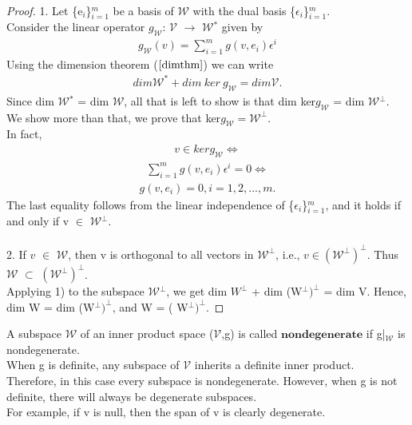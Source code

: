 \documentclass[12pt,a4paper]{article}
\begin{document}
\begin{proof}
1. Let \{e$_i$\}$^m_{i=1}$  be a basis of $\mathcal{W}$ with the dual basis \{$\epsilon$$_i$\}$^m_{i=1}$. \\Consider the linear operator $g_\mathcal{W}$: $\mathcal{V}$ $\to$ $\mathcal{W}$$^*$ given by
\begin{align*}
g_\mathcal{W}(v) = \sum_{i=1}^{m} g(v, e_i)\epsilon^i
\end{align*}
 Using the dimension theorem ($\ref{dimthm}$) we can write
 \begin{align*}
dim \mathcal{W}^* + dim \ ker \ g_\mathcal{W} = dim \mathcal{V}.
\end{align*}
Since dim $\mathcal{W}$$^*$ = dim $\mathcal{W}$, all that is left to show is that dim ker$g_\mathcal{W}$ = dim $\mathcal{W}$$^\perp$. \\We show more than that, we prove that ker$g_\mathcal{W} = \mathcal{W}^\perp$. \\In fact,\\
\begin{align*}
v \in ker g_\mathcal{W} \Leftrightarrow
\end{align*}
\begin{align*}
 \sum^m_{i=1} g(v, e_i) \epsilon^i = 0 \Leftrightarrow
 \end{align*}
\begin{align*}
g(v, e_i) = 0, i = 1, 2, ... , m.
\end{align*}
The last equality follows from the linear independence of  \{$\epsilon$$_i$\}$^m_{i=1}$, and it holds if and only if v $\in$ $\mathcal{W}$$^\perp$.\\\\
2. If $v$ $\in$ $\mathcal{W}$, then v is orthogonal to all vectors in $\mathcal{W}^\perp$, i.e., $v \in (\mathcal{W}^\perp)^\perp$. Thus $\mathcal{W}$ $\subset$ $(\mathcal{W}^\perp)^\perp$. \\
Applying 1) to the subspace
$\mathcal{W}$$^\perp$, we get dim $W^\perp$ + dim (W$^\perp)^\perp$ = dim V. Hence, dim W = dim (W$^\perp)^\perp$, and W = ( W$^\perp)^\perp$.
\end{proof}
A subspace $\mathcal{W}$ of an inner product space ($\mathcal{V}$,g) is called $\textbf{nondegenerate}$ if g|$_\mathcal{W}$ is nondegenerate. \\When g is definite, any subspace of $\mathcal{V}$ inherits
a definite inner product. \\Therefore, in this case every subspace is nondegenerate. However, when g is not definite, there will always be degenerate
subspaces.\\ For example, if v is null, then the span of v is clearly degenerate.
\end{document}
